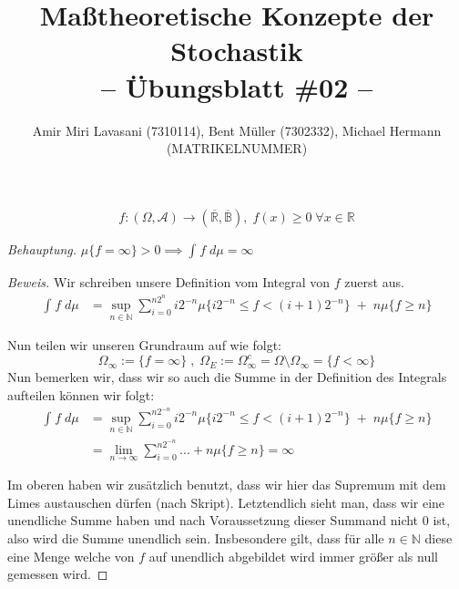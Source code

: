 \documentclass[10pt]{article}
\newcommand{\beh}{\textit{Behauptung. }}
\newenvironment{Aufgabe}[2][Aufgabe]{\begin{trivlist}
\item[\hskip \labelsep {\bfseries #1}\hskip \labelsep {\bfseries #2.}]}{\end{trivlist}}
\begin{document}
 
\title{ \textbf{Maßtheoretische Konzepte der Stochastik \\ -- Übungsblatt \#02 --} }

\author{Amir Miri Lavasani (7310114), Bent Müller (7302332),
        Michael Hermann (MATRIKELNUMMER)}
\maketitle

\begin{theorem} %
\begin{Aufgabe}{1} %
	\[
	f: \left(
		\Omega, \mathcal{A}
	\right) \longrightarrow \left(
		\overline{\mathbb{R}}, \overline{\mathbb{B}}
	\right) , \;
	f(x) \geq 0 \; \forall x \in \mathbb{R} 
	\]
\end{Aufgabe}

\beh $\mu \{f= \infty \} > 0 \implies \int_{}^{} f \; d\mu = \infty $

\begin{proof}[Beweis]
	Wir schreiben unsere Definition vom Integral von $f$ zuerst aus.
	\begin{align*}
		\int_{}^{} f \; d\mu &= \sup_{n \in \mathbb{N} } \sum_{i=0}^{n 2 ^{n}}
		i 2 ^{-n} \mu \{
			i 2 ^{-n} \leq f < (i+1) 2 ^{-n}
		\} \; + \; n \mu \{
			f \geq n
		\} 
	\end{align*}

	Nun teilen wir unseren Grundraum auf wie folgt:
	\[
	\Omega_\infty := \{
		f = \infty
	\}  \; , \;
	\Omega_E := \Omega_\infty ^{c}
	= \Omega \setminus \Omega_\infty
	= \{
		f < \infty
	\} 
	\] 
	Nun bemerken wir, dass wir so auch die Summe in der Definition des Integrals
	aufteilen können wir folgt:
	\begin{align*}
		\int_{}^{} f \; d\mu &= 
		\sup_{n \in \mathbb{N} } \sum_{i=0}^{n 2 ^{-n}} i 2 ^{-n}
		\mu \{
			i 2 ^{-n} \leq f < (i+1) 2 ^{-n}
		\} \; + \; n \mu \{
			f \geq n
		\} \\
		 &= \lim_{n \to \infty} \sum_{i=0}^{n 2 ^{ -n }} ... +
		 n \mu \{
		 	f \geq n
		 \} = \infty
	\end{align*}

	Im oberen haben wir zusätzlich benutzt, dass wir hier das Supremum mit dem
	Limes austauschen dürfen (nach Skript). Letztendlich sieht man, dass
	wir eine unendliche Summe haben und nach Voraussetzung dieser Summand
	nicht 0 ist, also wird die Summe unendlich sein. Insbesondere gilt, dass
	für alle $n \in \mathbb{N} $ diese eine Menge welche von $f$ auf unendlich
	abgebildet wird immer größer als null gemessen wird.



\end{proof}
\end{theorem}
\end{document}
